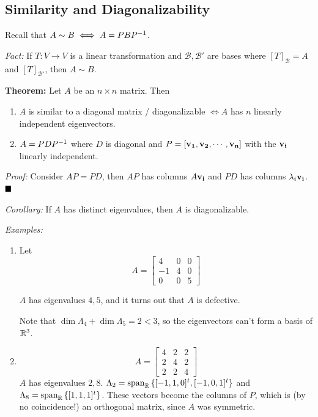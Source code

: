 \hypertarget{similarity-and-diagonalizability}{%
\subsection{Similarity and
Diagonalizability}\label{similarity-and-diagonalizability}}

Recall that \(A \sim B \iff A = PBP^{-1}\).

\emph{Fact:} If \(T:V \to V\) is a linear transformation and
\(\mathcal{B}, \mathcal{B}'\) are bases where \([T]_{\mathcal{B}} = A\)
and \([T]_{\mathcal{B}'}\), then \(A \sim B\).

\textbf{Theorem:} Let \(A\) be an \(n\times n\) matrix. Then

\begin{enumerate}
\def\labelenumi{\arabic{enumi}.}
\item
  \(A\) is similar to a diagonal matrix / diagonalizable \(\iff A\) has
  \(n\) linearly independent eigenvectors.
\item
  \(A = PDP^{-1}\) where \(D\) is diagonal and
  \(P = [\mathbf{v_1}, \mathbf{v_2}, \cdots, \mathbf{v_n}]\) with the
  \(\mathbf{v_i}\) linearly independent.
\end{enumerate}

\emph{Proof:} Consider \(AP = PD\), then \(AP\) has columns
\(A\mathbf{v_i}\) and \(PD\) has columns \(\lambda_i \mathbf{v_i}\).
\(\qed\)

\emph{Corollary:} If \(A\) has distinct eigenvalues, then \(A\) is
diagonalizable.

\emph{Examples:}

\begin{enumerate}
\def\labelenumi{\arabic{enumi}.}
\item
  Let \[
  A =
  \left[\begin{array}{ccc}
  4 & 0 & 0 \\
  -1 & 4 & 0 \\
  0 & 0 & 5
  \end{array}\right]
  \]

  \(A\) has eigenvalues \(4,5\), and it turns out that \(A\) is
  defective.

  Note that \(\dim \Lambda_4 + \dim \Lambda_5 = 2 < 3\), so the
  eigenvectors can't form a basis of \({\mathbb{R}}^3\).
\item
  \[
  A =
  \left[\begin{array}{ccc}
  4 & 2 & 2 \\
  2 & 4 & 2 \\
  2 & 2 & 4
  \end{array}\right]
  \] \(A\) has eigenvalues \(2, 8\).
  \(\Lambda_2 = {\mathrm{span}}_{\mathbb{R}}\left\{{[-1, 1, 0]^t, [-1, 0, 1]^t}\right\}\) and
  \(\Lambda_8 = {\mathrm{span}}_{\mathbb{R}}\left\{{[1,1,1]^t}\right\}\). These vectors become
  the columns of \(P\), which is (by no coincidence!) an orthogonal
  matrix, since \(A\) was symmetric.
\end{enumerate}


